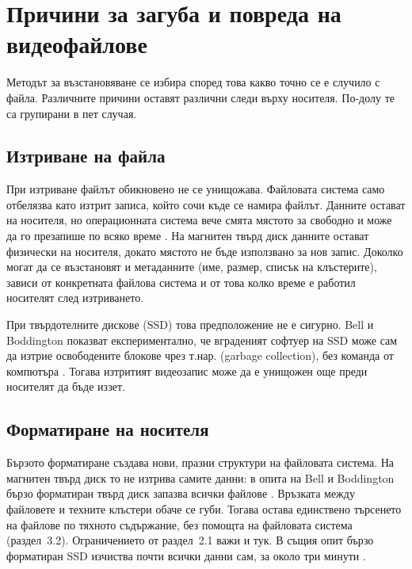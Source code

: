 \section{Причини за загуба и повреда на видеофайлове}

Методът за възстановяване се избира според това какво точно се е случило с файла.
Различните причини оставят различни следи върху носителя. По-долу те са групирани в
пет случая.

\subsection{Изтриване на файла}

При изтриване файлът обикновено не се унищожава. Файловата система само отбелязва
като изтрит записа, който сочи къде се намира файлът. Данните остават на носителя, но
операционната система вече смята мястото за свободно и може да го презапише по всяко
време \cite{nist80086}. На магнитен твърд диск данните остават физически на носителя, докато
мястото не бъде използвано за нов запис. Доколко могат да се възстановят и метаданните
(име, размер, списък на клъстерите), зависи от конкретната файлова система и от това колко
време е работил носителят след изтриването.

При твърдотелните дискове (SSD) това предположение не е сигурно. Bell и Boddington
показват експериментално, че вграденият софтуер на SSD може сам да изтрие
освободените блокове чрез т.нар.  (garbage collection), без
команда от компютъра \cite{bell2010}. Тогава изтритият видеозапис може да е унищожен
още преди носителят да бъде иззет.

\subsection{Форматиране на носителя}

Бързото форматиране създава нови, празни структури на файловата система. На магнитен
твърд диск то не изтрива самите данни: в опита на Bell и Boddington бързо форматиран
твърд диск запазва всички файлове \cite{bell2010}. Връзката между файловете и техните клъстери обаче
се губи. Тогава остава единствено търсенето на файлове по тяхното съдържание, без
помощта на файловата система (раздел~3.2). Ограничението от раздел~2.1 важи и тук. В същия опит
бързо форматиран SSD изчиства почти всички данни сам, за около три минути
\cite{bell2010}.

